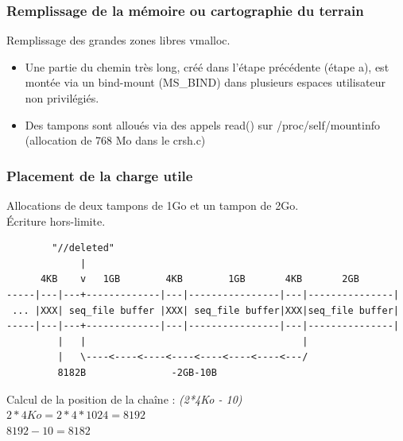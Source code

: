\documentclass{beamer}
\begin{document}
\begin{frame}
    \frametitle{Remplissage de la mémoire ou cartographie du terrain}

    Remplissage des grandes zones libres vmalloc.
    \begin{itemize}
        \item Une partie du chemin très long, créé dans l'étape précédente (étape a), est montée via un bind-mount (MS\_BIND) dans plusieurs espaces utilisateur non privilégiés.
        \item Des tampons sont alloués via des appels read() sur /proc/self/mountinfo (allocation de 768 Mo dans le crsh.c)
    \end{itemize}    
\end{frame}

\begin{frame}[fragile]
    \frametitle{Placement de la charge utile}
    
    Allocations de deux tampons de 1Go et un tampon de 2Go.\\
    Écriture hors-limite.
    \begin{verbatim}
        "//deleted"
             |
      4KB    v   1GB        4KB        1GB       4KB       2GB
-----|---|---+-------------|---|----------------|---|---------------|
 ... |XXX| seq_file buffer |XXX| seq_file buffer|XXX|seq_file buffer|
-----|---|---+-------------|---|----------------|---|---------------|
         |   |                                      |
         |   \----<----<----<----<----<----<----<---/
         8182B               -2GB-10B
    \end{verbatim} 
    Calcul de la position de la chaîne : \hfill \textit{\scriptsize{(2*4Ko - 10)}} \\
    $2 * 4Ko = 2 * 4 * 1024 = 8192 $\\$ 8192 - 10 = 8182 $
\end{frame}

\end{document}
